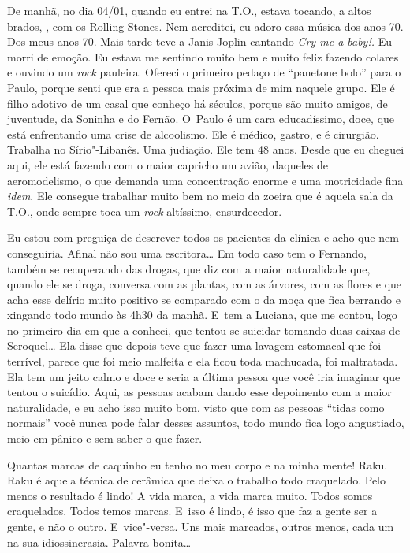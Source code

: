 De manhã, no dia 04/01, quando eu entrei na T.O., estava tocando, a
altos brados, \emph{}, com os Rolling Stones. Nem acreditei,
eu adoro essa música dos anos 70. Dos meus anos 70. Mais tarde teve a
Janis Joplin cantando \emph{Cry me a baby!.} Eu morri de emoção. Eu
estava me sentindo muito bem e muito feliz fazendo colares e ouvindo um
\emph{rock} pauleira. Ofereci o primeiro pedaço de ``panetone bolo''
para o Paulo, porque senti que era a pessoa mais próxima de mim naquele
grupo. Ele é filho adotivo de um casal que conheço há séculos, porque
são muito amigos, de juventude, da Soninha e do Fernão. O~Paulo é um
cara educadíssimo, doce, que está enfrentando uma crise de alcoolismo.
Ele é médico, gastro, e é cirurgião. Trabalha no Sírio"-Libanês. Uma
judiação. Ele tem 48 anos. Desde que eu cheguei aqui, ele está fazendo
com o maior capricho um avião, daqueles de aeromodelismo, o que demanda
uma concentração enorme e uma motricidade fina \emph{idem}. Ele consegue
trabalhar muito bem no meio da zoeira que é aquela sala da T.O., onde
sempre toca um \emph{rock} altíssimo, ensurdecedor.

Eu estou com preguiça de descrever todos os pacientes da clínica e acho
que nem conseguiria. Afinal não sou uma escritora… Em todo caso
tem o Fernando, também se recuperando das drogas, que diz com a maior
naturalidade que, quando ele se droga, conversa com as plantas, com as
árvores, com as flores e que acha esse delírio muito positivo se
comparado com o da moça que fica berrando e xingando todo mundo às 4h30
da manhã. E~tem a Luciana, que me contou, logo no primeiro dia em que a
conheci, que tentou se suicidar tomando duas caixas de Seroquel…
Ela disse que depois teve que fazer uma lavagem estomacal que foi
terrível, parece que foi meio malfeita e ela ficou toda machucada, foi
maltratada. Ela tem um jeito calmo e doce e seria a última pessoa que
você iria imaginar que tentou o suicídio. Aqui, as pessoas acabam dando
esse depoimento com a maior naturalidade, e eu acho isso muito bom,
visto que com as pessoas ``tidas como normais'' você nunca pode falar
desses assuntos, todo mundo fica logo angustiado, meio em pânico e sem
saber o que fazer.

Quantas marcas de caquinho eu tenho no meu corpo e na minha mente! Raku.
Raku é aquela técnica de cerâmica que deixa o trabalho todo craquelado.
Pelo menos o resultado é lindo! A vida marca, a vida marca muito. Todos
somos craquelados. Todos temos marcas. E~isso é lindo, é isso que faz a
gente ser a gente, e não o outro. E~vice"-versa. Uns mais marcados,
outros menos, cada um na sua idiossincrasia. Palavra bonita…

